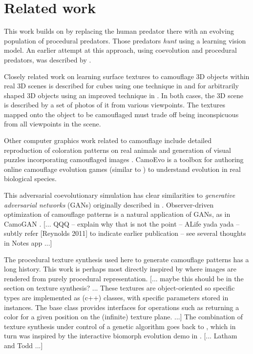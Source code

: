 \documentclass[sigconf]{acmart}
\newcommand{\jargon}[1]{\textit{#1}}
\begin{document}
\section{Related work}
This work builds on \citet{Reynolds2011} by replacing the human predator there with an evolving population of procedural predators. Those predators \jargon{hunt} using a learning vision model. An earlier attempt at this approach, using coevolution and procedural predators, was described by \citet{harrington_coevolution_2014}.
\par
Closely related work on learning surface textures to camouflage 3D objects within real 3D scenes is described for cubes using one technique in \citet{owens_camouflaging_2014} and for arbitrarily shaped 3D objects using an improved technique in \citet{guo_ganmouflage_2022}. In both cases, the 3D scene is described by a set of photos of it from various viewpoints. The textures mapped onto the object to be camouflaged must trade off being inconspicuous from all viewpoints in the scene.
\par
Other computer graphics work related to camouflage include detailed reproduction of coloration patterns on real animals \cite{de_gomensoro_malheiros_leopard_2020} and generation of visual puzzles incorporating camouflaged images \cite{chu_camo_image_2010} \cite{Zhang_Yin_Nie_Zheng_2020}. CamoEvo \cite{hancock_camoevo_2022} is a toolbox for authoring online camouflage evolution games (similar to \citet{Reynolds2011}) to understand evolution in real biological species.
\par
This adversarial coevolutionary simulation has clear similarities to \jargon{generative adversarial networks} (GANs) originally described in \citet{goodfellow_gan_2014}. Observer-driven optimization of camouflage patterns is a natural application of GANs, as in CamoGAN \cite{talas_camogan_2020}. [... QQQ -- explain why that is not the point -- ALife yada yada -- subtly refer [Reynolds 2011] to indicate earlier publication -- see several thoughts in Notes app ...]
\par
The procedural texture synthesis used here to generate camouflage patterns has a long history. This work is perhaps most directly inspired by \citet{perlin_image_1985} where images are rendered from purely procedural representation. [... maybe this should be in the section on texture synthesis? ... These textures are object-oriented so specific types are implemented as (c++) classes, with specific parameters stored in instances. The base class provides interfaces for operations such as returning a color for a given position on the (infinite) texture plane. ...] The combination of texture synthesis under control of a genetic algorithm goes back to \citet{sims_artificial_1991}, which in turn was inspired by the interactive biomorph evolution demo in \citet{dawkins_blind_1986}. [... Latham and Todd ...]
\end{document}
